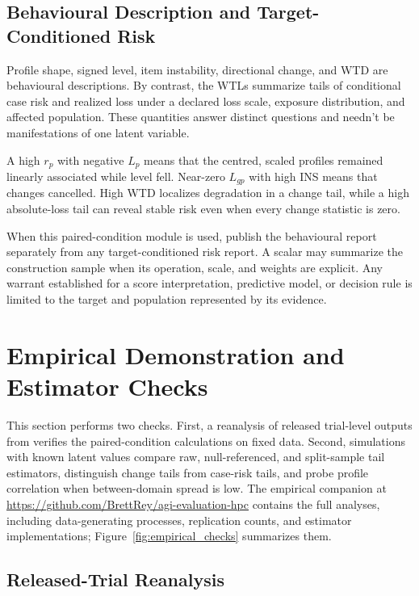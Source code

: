 \documentclass[12pt]{article}
\begin{document}
\subsection{Behavioural Description and Target-Conditioned Risk}\label{ssec:no_scalar}

Profile shape, signed level, item instability, directional change, and WTD are behavioural descriptions. By contrast, the WTLs summarize tails of conditional case risk and realized loss under a declared loss scale, exposure distribution, and affected population. These quantities answer distinct questions and needn't be manifestations of one latent variable.

A high \(r_p\) with negative \(L_p\) means that the centred, scaled profiles remained linearly associated while level fell. Near-zero \(L_{gp}\) with high INS means that changes cancelled. High WTD localizes degradation in a change tail, while a high absolute-loss tail can reveal stable risk even when every change statistic is zero.

When this paired-condition module is used, publish the behavioural report separately from any target-conditioned risk report. A scalar may summarize the construction sample when its operation, scale, and weights are explicit. Any warrant established for a score interpretation, predictive model, or decision rule is limited to the target and population represented by its evidence.

\section{Empirical Demonstration and Estimator Checks}\label{sec:demonstration}

This section performs two checks. First, a reanalysis of released trial-level outputs from \textcite{zhang2026illusionRobustness} verifies the paired-condition calculations on fixed data. Second, simulations with known latent values compare raw, null-referenced, and split-sample tail estimators, distinguish change tails from case-risk tails, and probe profile correlation when between-domain spread is low. The empirical companion at \url{https://github.com/BrettRey/agi-evaluation-hpc} contains the full analyses, including data-generating processes, replication counts, and estimator implementations; Figure~\ref{fig:empirical_checks} summarizes them.

\subsection{Released-Trial Reanalysis}\label{ssec:zhang_reanalysis}
\end{document}
